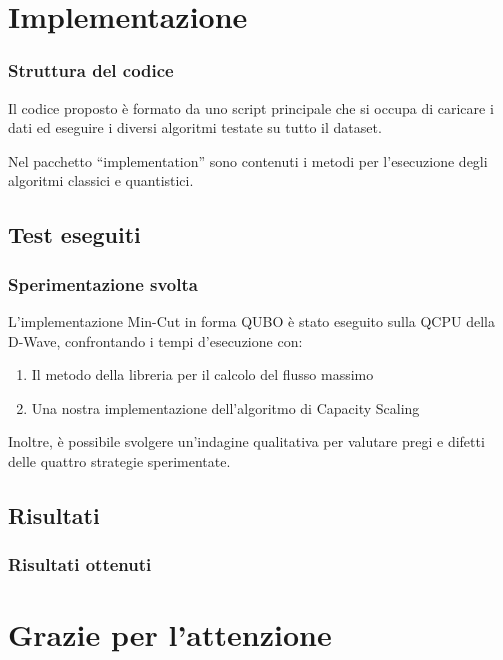 \documentclass[10pt]{beamer}
\begin{document}
\section{Implementazione}
\begin{frame}
  \frametitle{Struttura del codice}

  Il codice proposto è formato da uno script principale che si occupa di caricare i dati ed eseguire i diversi algoritmi testate su tutto il dataset.

  Nel pacchetto ``implementation'' sono contenuti i metodi per l'esecuzione degli algoritmi classici e quantistici.

\end{frame}
\subsection{Test eseguiti}
\begin{frame}
  \frametitle{Sperimentazione svolta}

  L'implementazione Min-Cut in forma QUBO è stato eseguito sulla QCPU della D-Wave, confrontando i tempi d'esecuzione con:
  
  \begin{enumerate}
    \item Il metodo della libreria per il calcolo del flusso massimo
    \item Una nostra implementazione dell'algoritmo di Capacity Scaling
  \end{enumerate} 

  Inoltre, è possibile svolgere un'indagine qualitativa per valutare pregi e difetti delle quattro strategie sperimentate.

\end{frame}
\subsection{Risultati}
\begin{frame}
  \frametitle{Risultati ottenuti}

  \begin{figure}
  \end{figure}

\end{frame}

\section*{Grazie per l'attenzione}
\end{document}
